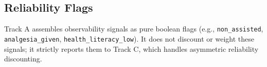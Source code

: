 \subsection{Reliability Flags}
Track A assembles observability signals as pure boolean flags (e.g., \texttt{non\_assisted}, \texttt{analgesia\_given}, \texttt{health\_literacy\_low}). It does not discount or weight these signals; it strictly reports them to Track C, which handles asymmetric reliability discounting.
